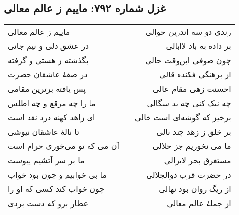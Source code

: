 \begin{center}
\section*{غزل شماره ۷۹۲: ماییم ز عالم معالی}
\label{sec:792}
\begin{longtable}{l p{0.5cm} r}
ماییم ز عالم معالی
&&
رندی دو سه اندرین حوالی
\\
در عشق دلی و نیم جانی
&&
بر داده به باد لاابالی
\\
بگذشته ز هستی و گرفته
&&
چون صوفی ابن‌وقت حالی
\\
در صفهٔ عاشقان حضرت
&&
از برهنگی فکنده قالی
\\
پس یافته برترین مقامی
&&
احسنت زهی مقام عالی
\\
ما را چه مرقع و چه اطلس
&&
چه نیک کنی چه بد سگالی
\\
ای زاهد کهنه درد نقد است
&&
برخیز که گوشه‌ای است خالی
\\
تا نالهٔ عاشقان نیوشی
&&
بر خلق ز زهد چند نالی
\\
آن می که تو می‌خوری حرام است
&&
ما می نخوریم جز حلالی
\\
ما بر سر آتشیم پیوست
&&
مستغرق بحر لایزالی
\\
ما بی خوابیم و چون بود خواب
&&
در حضرت قرب ذوالجلالی
\\
چون خواب کند کسی که او را
&&
از ریگ روان بود نهالی
\\
عطار برو که دست بردی
&&
از جملهٔ عالم معالی
\\
\end{longtable}
\end{center}

